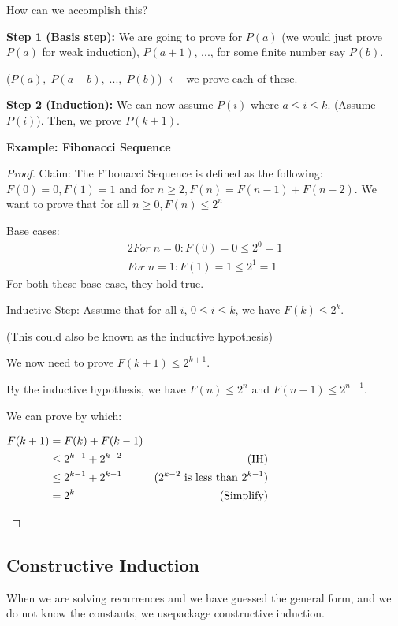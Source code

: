 \documentclass{article}
\begin{document}
How can we accomplish this?

\textbf {Step 1 (Basis step):} We are going to prove for $ P(a) $ (we would just prove $ P(a) $ for weak induction), $ P(a + 1) $, ...,
for some finite number say $ P(b) $. 

($P(a),\; P(a + b),\;...,\;P(b)$) $ \leftarrow $ we prove each of these.

\textbf {Step 2 (Induction):} We can now assume $ P(i) $ where $ a \le i \le k $. (Assume $ P(i) $).
Then, we prove $ P(k + 1) $.

\textbf {Example: Fibonacci Sequence}
\begin{proof}
Claim: The Fibonacci Sequence is defined as the following: $ F(0) = 0, F(1) = 1 $ and for $ n \ge 2, F(n) = F(n - 1) + F(n - 2). $
We want to prove that for all $ n \ge 0 , F(n) \le 2^n $

Base cases:
\begin{alignat*}{2}
For\; n = 0: F(0) = 0 \le 2^0 = 1
\\
For\; n = 1: F(1) = 1 \le 2^1 = 1
\end{alignat*}
For both these base case, they hold true. 

Inductive Step: 
Assume that for all $ i $, $ 0 \le i \le k $, we have $ F(k) \le 2 ^ k $.

(This could also be known as the inductive hypothesis)

We now need to prove $ F(k + 1) \le 2 ^ {k + 1} $.

By the inductive hypothesis, we have $ F(n) \le 2^n $ and $ F(n - 1) \le 2^{n-1} $.

We can prove by which:
\begin{center}
  $\begin{aligned}
    F(k+1) & = F(k) + F(k-1)
    \\
    & \le 2^{k-1} + 2^{k-2} & \text{(IH)}
    \\
    & \le 2^{k-1} + 2^{k-1} & \text{($ 2^{k-2} $ is less than $ 2^{k-1} $)}
    \\
    & = 2^k & \text{(Simplify)} 
  \end{aligned}$
\end{center}
\end{proof}

\subsection{Constructive Induction}
When we are solving recurrences and we have guessed the general form, and we do not know the constants, we usepackage
constructive induction.
\end{document}
